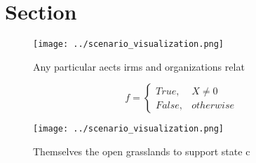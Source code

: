 \documentclass[a4paper]{article}
\begin{document}
\section{Section}

\begin{figure}
\centering
\texttt{[image: ../scenario\_visualization.png]}
\caption{Any particular aects irms and organizations relat
}
\end{figure}
 
\begin{equation}   f =
\begin{cases} True, & X \neq 0\\
False, & otherwise
\end{cases}
\end{equation}

\begin{figure}
\centering
\texttt{[image: ../scenario\_visualization.png]}
\caption{Themselves the open grasslands to support state c
}
\end{figure}
 
\end{document}
